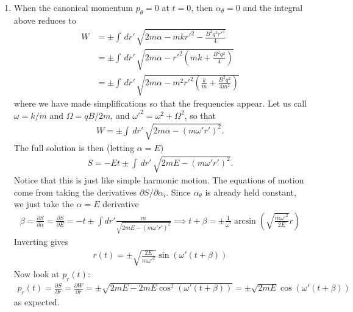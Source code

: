 \documentclass{article}
\theoremstyle{definition}
\newcommand{\p}{\partial}
\newcommand{\al}{\alpha}
\newcommand{\be}{\beta}
\newcommand{\f}[2]{\frac{#1}{#2}}
\newcommand{\lp}{\left(}
\newcommand{\rp}{\right)}
\begin{document}
\begin{enumerate}[label=(\alph*)]
	
	\item When the canonical momentum $p_\theta = 0$ at $t=0$, then $\al_\theta = 0$ and the integral above reduces to 
	\begin{align*}
	{W} &= \pm \int \,dr' \, \sqrt{2m\al - mkr'^2 - \f{B^2q^2r'^2}{4} } \\
	&= {\pm \int \,dr' \, \sqrt{2m\al - r'^2\lp mk + \f{B^2q^2}{4} \rp }}\\
	&= \pm \int \,dr' \, \sqrt{2m\al - m^2r'^2\lp \f{k}{m} + \f{B^2q^2}{4m^2} \rp }
	\end{align*}
	where we have made simplifications so that the frequencies appear. Let us call $\omega = k/m$ and $\Omega = qB/2m$, and $\omega'^2 = \omega^2 + \Omega^2$, so that
	\begin{align*}
	W = \pm \int \,dr' \, \sqrt{2m\al - (m\omega'r')^2 }.
	\end{align*}
	The full solution is then (letting $\al = E$)
	\begin{align*}
	S = -Et \pm \int \,dr' \, \sqrt{2mE - (m\omega'r')^2  }.
	\end{align*}
	Notice that this is just like simple harmonic motion. The equations of motion come from taking the derivatives $\p S/\p \al_i$. Since $\al_\theta$ is already held constant, we just take the $\al=E$ derivative
	\begin{align*}
	\be = \f{\p S}{\p \al} = \f{\p S}{\p E} = -t \pm \int dr' \f{m}{\sqrt{2mE -  (m\omega'r')^2}} \implies 
	t + \be = \pm \f{1}{\omega'}\arcsin\lp \sqrt{\f{m\omega'^2}{2E}} r\rp 
	\end{align*}
	Inverting gives
	\begin{align*}
	\boxed{r(t) = \pm \sqrt{\f{2E}{m\omega'^2}}\sin(\omega'(t+\be))}
	\end{align*}
	Now look at $p_r(t)$:
	\begin{align*}
	\boxed{p_r(t)} = \f{\p S}{\p r} = \f{\p W}{\p r} = \pm \sqrt{2mE - 2mE\cos^2(\omega'(t+\be))} = 
	\boxed{\pm \sqrt{2mE} \cos(\omega'(t+\be))}
	\end{align*}
	as expected.
\end{enumerate}
\end{document}
